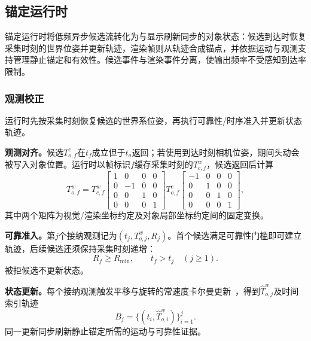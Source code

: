 \documentclass[review]{vgtc}
\begin{document}
\subsection{锚定运行时}\label{sec:anchoring}

锚定运行时将低频异步候选流转化为与显示刷新同步的对象状态：候选到达时恢复采集时刻的世界位姿并更新轨迹，渲染帧则从轨迹合成锚点，并依据运动与观测支持管理静止锚定和有效性。候选事件与渲染事件分离，使输出频率不受感知到达率限制。

\subsubsection{观测校正}\label{sec:obs-update}

运行时先按采集时刻恢复候选的世界系位姿，再执行可靠性/时序准入并更新状态轨迹。

\textbf{观测对齐。}候选$T_{o,f}^{c}$在$t_f$成立但于$t_a$返回；若使用到达时刻相机位姿，期间头动会被写入对象位置。运行时以帧标识$f$缓存采集时刻的$T_{c,f}^{w}$，候选返回后计算
\begin{equation}
T_{o,f}^{w} = T_{c,f}^{w}
\begin{bmatrix}
1 & 0 & 0 & 0 \\
0 & -1 & 0 & 0 \\
0 & 0 & 1 & 0 \\
0 & 0 & 0 & 1
\end{bmatrix}
T_{o,f}^{c}
\begin{bmatrix}
-1 & 0 & 0 & 0 \\
0 & 1 & 0 & 0 \\
0 & 0 & 1 & 0 \\
0 & 0 & 0 & 1
\end{bmatrix},
\label{eq:capture-alignment}
\end{equation}
其中两个矩阵为视觉/渲染坐标约定及对象局部坐标约定间的固定变换。

\textbf{可靠准入。}第$j$个接纳观测记为$(t_j,T_{o,j}^{w},R_j)$。首个候选满足可靠性门槛即可建立轨迹，后续候选还须保持采集时刻递增：
\begin{equation}
R_f \geq R_{\min}, \qquad t_f > t_j \quad (j \geq 1).
\label{eq:admission}
\end{equation}
被拒候选不更新状态。

\textbf{状态更新。}每个接纳观测触发平移与旋转的常速度卡尔曼更新~\cite{kalman1960new}，得到$\widehat{T}_{o,j}^{w}$及时间索引轨迹
\begin{equation}
B_j = \{(t_i, \widehat{T}_{o,i}^{w})\}_{i=1}^{j}.
\label{eq:trajectory}
\end{equation}
同一更新同步刷新静止锚定所需的运动与可靠性证据。
\end{document}
